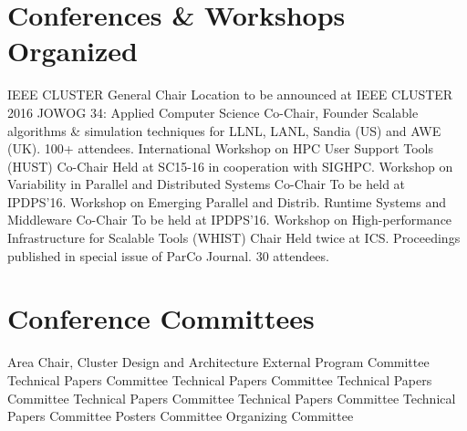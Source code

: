 \section{Conferences \& Workshops Organized}
        {IEEE CLUSTER}
        {General Chair}
        {}{}
        {Location to be announced at IEEE CLUSTER 2016}
		{JOWOG 34: Applied Computer Science}
		{Co-Chair, Founder}
		{}{}
		{Scalable algorithms \& simulation techniques for
		 LLNL, LANL, Sandia (US) and AWE (UK).  100+ attendees.}
		{International Workshop on HPC User Support Tools (HUST)}
		{Co-Chair}{}{}
		{Held at SC15-16 in cooperation with SIGHPC.}
		{Workshop on Variability in Parallel and Distributed Systems}
		{Co-Chair}{}{}
		{To be held at IPDPS'16.}
		{Workshop on Emerging Parallel and Distrib. Runtime Systems and Middleware}
		{Co-Chair}{}{}
		{To be held at IPDPS'16.}
		{Workshop on High-performance Infrastructure for Scalable Tools (WHIST)}
		{Chair}{}{}
		{Held twice at ICS. Proceedings published in special issue of ParCo Journal. 30 attendees.}


\section{Conference Committees}
		{Area Chair, Cluster Design and Architecture}{}{}{}
		{External Program Committee}{}{}{}
		{Technical Papers Committee}{}{}{}
		{Technical Papers Committee}{}{}{}
		{Technical Papers Committee}{}{}{}
		{Technical Papers Committee}{}{}{}
		{Technical Papers Committee}{}{}{}
		{Technical Papers Committee}{}{}{}
		{Posters Committee}{}{}{}
        {Organizing Committee}{}{}{}

